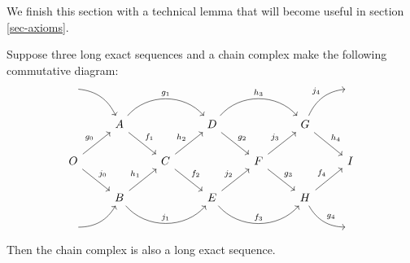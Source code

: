We finish this section with a technical lemma that will become useful in section \ref{sec-axioms}.

\begin{lemma}\label{braid-lemma}
Suppose three long exact sequences and a chain complex make the following commutative diagram:
\[\begin{tikzcd}
{} \arrow[rd, bend left]              &                                                      &                                       &                                                      &                                       &                                                   & {} \\
                                      & A \arrow[rd, "f_1"] \arrow[rr, "g_1", bend left=49]  &                                       & D \arrow[rr, "h_3", bend left=49] \arrow[rd, "g_2"]  &                                       & G \arrow[rd, "h_4"] \arrow[ru, "j_4", bend left]  &    \\
O \arrow[ru, "g_0"] \arrow[rd, "j_0"] &                                                      & C \arrow[rd, "f_2"] \arrow[ru, "h_2"] &                                                      & F \arrow[ru, "j_3"] \arrow[rd, "g_3"] &                                                   & I  \\
                                      & B \arrow[ru, "h_1"] \arrow[rr, "j_1", bend right=49] &                                       & E \arrow[rr, "f_3", bend right=49] \arrow[ru, "j_2"] &                                       & H \arrow[ru, "f_4"] \arrow[rd, "g_4", bend right] &    \\
{} \arrow[ru, bend right]             &                                                      &                                       &                                                      &                                       &                                                   & {}
\end{tikzcd}\]
Then the chain complex is also a long exact sequence.
\end{lemma}
